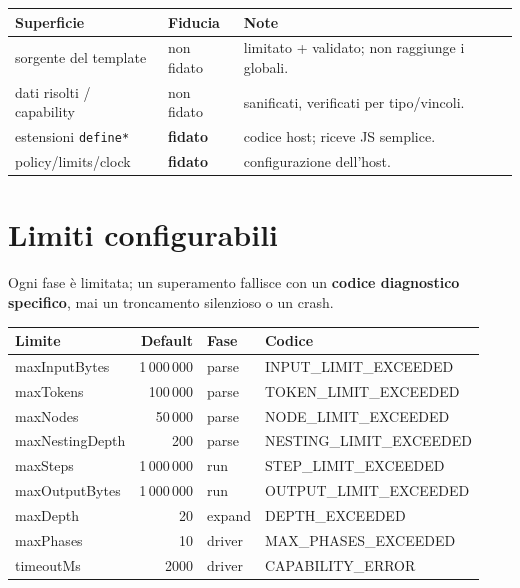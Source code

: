 \documentclass[11pt,a4paper]{book}
\let\code\lstinline
\newcommand{\ic}[1]{{\ttfamily #1}}
\theoremstyle{definition}
\begin{document}
{{{{\begin{center}
\small
\begin{tabular}{@{}l l p{6.6cm}@{}}
\toprule
\textbf{Superficie} & \textbf{Fiducia} & \textbf{Note} \\
\midrule
sorgente del template & non fidato & limitato + validato; non raggiunge i globali. \\
dati risolti / capability & non fidato & sanificati, verificati per tipo/vincoli. \\
estensioni \code|define*| & \textbf{fidato} & codice host; riceve JS semplice. \\
\ic{policy}/\ic{limits}/\ic{clock} & \textbf{fidato} & configurazione dell'host. \\
\bottomrule
\end{tabular}
\end{center}

\section{Limiti configurabili}

Ogni fase è limitata; un superamento fallisce con un \textbf{codice diagnostico
specifico}, mai un troncamento silenzioso o un crash.

\begin{center}
\small
\begin{tabular}{@{}l r l l@{}}
\toprule
\textbf{Limite} & \textbf{Default} & \textbf{Fase} & \textbf{Codice} \\
\midrule
\ic{maxInputBytes} & 1\,000\,000 & parse & \ic{INPUT\_LIMIT\_EXCEEDED} \\
\ic{maxTokens} & 100\,000 & parse & \ic{TOKEN\_LIMIT\_EXCEEDED} \\
\ic{maxNodes} & 50\,000 & parse & \ic{NODE\_LIMIT\_EXCEEDED} \\
\ic{maxNestingDepth} & 200 & parse & \ic{NESTING\_LIMIT\_EXCEEDED} \\
\ic{maxSteps} & 1\,000\,000 & run & \ic{STEP\_LIMIT\_EXCEEDED} \\
\ic{maxOutputBytes} & 1\,000\,000 & run & \ic{OUTPUT\_LIMIT\_EXCEEDED} \\
\ic{maxDepth} & 20 & expand & \ic{DEPTH\_EXCEEDED} \\
\ic{maxPhases} & 10 & driver & \ic{MAX\_PHASES\_EXCEEDED} \\
\ic{timeoutMs} & 2000 & driver & \ic{CAPABILITY\_ERROR} \\
\bottomrule
\end{tabular}
\end{center}

}}}}
\end{document}
